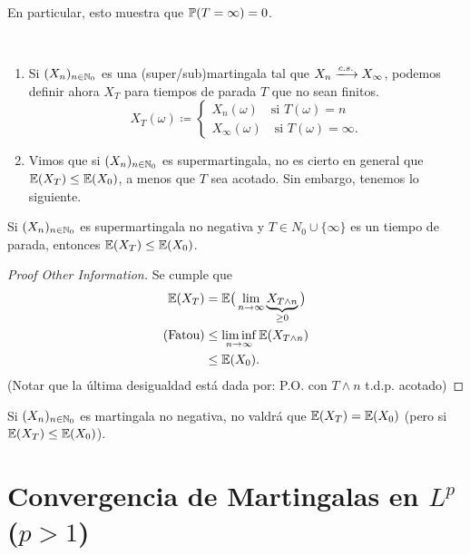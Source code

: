 \begin{remark}
	En particular, esto muestra que $\mathbb{P}(T = \infty) = 0$.
\end{remark}

\begin{comentarios}~
	\begin{enumerate}
		\item Si $(X_{n})_{n \in \mathbb{N}_{0}}$ es una (super/sub)martingala tal que $X_{n} \xlongrightarrow{c.s.} X_{\infty}$, podemos definir ahora $X_{T}$ para tiempos de parada $T$ que no sean finitos.
		\[ X_{T}(\omega) \coloneq \begin{cases}
			X_{n}(\omega) \quad \text{si } T(\omega) = n \\
			X_{\infty}(\omega) \quad \text{si } T(\omega) = \infty.
		\end{cases} \]

		\item Vimos que si $(X_{n})_{n \in \mathbb{N}_{0}}$ es supermartingala, no es cierto en general que $\mathbb{E}(X_{T}) \leq \mathbb{E}(X_{0})$, a menos que $T$ sea acotado. Sin embargo, tenemos lo siguiente.
	\end{enumerate}
\end{comentarios}

\begin{prop}
	Si $(X_{n})_{n \in \mathbb{N}_{0}}$ es supermartingala no negativa y $T \in N_{0} \cup \{\infty\}$ es un tiempo de parada, entonces $\mathbb{E}(X_{T}) \leq \mathbb{E}(X_{0})$.
\end{prop}
\begin{proof}[Proof Other Information]
	Se cumple que
	\begin{align*}
		\mathbb{E}(X_{T}) &= \mathbb{E}\big(\lim_{n \to \infty} \underbrace{X_{T \wedge n}}_{\geq 0}\big) \\
		\text{(Fatou)} &\leq \liminf_{n \to \infty} \mathbb{E}(X_{T \wedge n}) \\
		&\leq \mathbb{E}(X_{0})
	.\end{align*}
	(Notar que la última desigualdad está dada por: P.O. con $T \wedge n$ t.d.p. acotado)
\end{proof}

\begin{remark}
	Si $(X_{n})_{n \in \mathbb{N}_{0}}$ es martingala no negativa, no valdrá que $\mathbb{E}(X_{T}) = \mathbb{E}(X_{0})$ (pero si $\mathbb{E}(X_{T}) \leq \mathbb{E}(X_{0})$).
\end{remark}

\section{Convergencia de Martingalas en $L^{p}$ ($p > 1$)}

